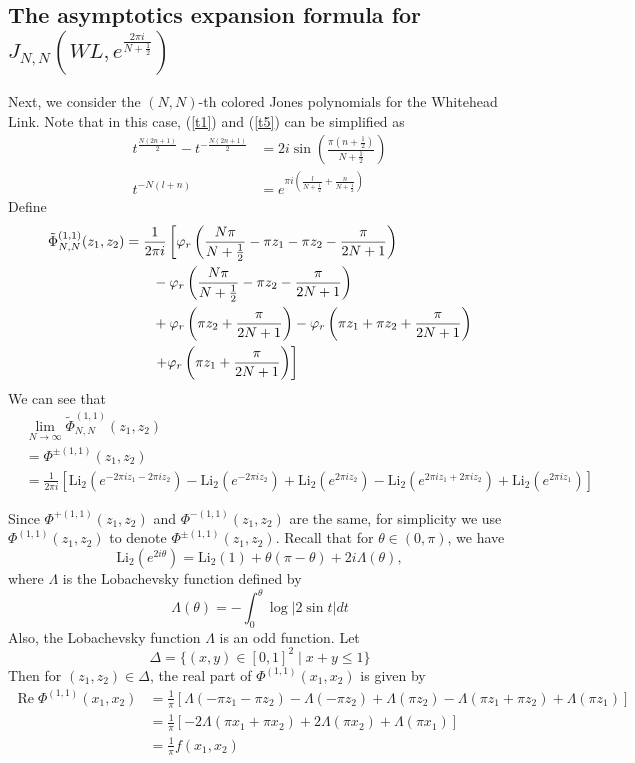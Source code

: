 \documentclass[10pt,a4paper]{article}
\newcommand{\lt}{\left}
\newcommand{\rt}{\right}
\def \Re{\operatorname{Re}}
\def \Re{\operatorname{Re}}
\def \Li{\operatorname{Li_2}}
\begin{document}
\subsection{The asymptotics expansion formula for $J_{N,N}(WL, e^{\frac{2\pi i}{N+\frac{1}{2}}})$}\label{WLNN}
Next, we consider the $(N,N)$-th colored Jones polynomials for the Whitehead Link. Note that in this case, (\ref{t1}) and (\ref{t5}) can be simplified as
\begin{align*}
 t^{\frac{N(2n+1)}{2}}-t^{-\frac{N(2n+1)}{2}} 
&= 2i\sin\lt( \frac{\pi(n+\frac{1}{2})}{N+\frac{1}{2}} \rt) \\
t^{-N(l+n)} 
&= e^{\pi i\lt( \frac{l}{N+\frac{1}{2}} + \frac{n}{N+\frac{1}{2}} \rt)}
\end{align*}
Define
\begin{align}
\tilde\Phi^{(1,1)}_{N,N} (z_1,z_2) 
&= \frac{1}{2\pi i} \lt[\varphi_r \lt( \frac{N\pi}{N+\frac{1}{2}}  - \pi z_1 - \pi z_2 -\frac{\pi}{2N+1}\rt) \rt. \notag\\
&\qquad  - \varphi_r\lt(  \frac{N\pi}{N+\frac{1}{2}} - \pi z_2- \frac{\pi}{2N+1}\rt) \notag \\
&\qquad  + \varphi_r \lt(\pi z_2 + \frac{\pi}{2N+1}\rt)  - \varphi_r\lt( \pi z_1 + \pi z_2 + \frac{\pi}{2N+1}\rt) \notag\\
&\lt.\qquad  + \varphi_r\lt( \pi z_1 + \frac{\pi}{2N+1}\rt) \rt] 
\end{align}
We can see that 
\begin{align*}
&\lim_{N\to\infty} \tilde\Phi^{(1,1)}_{N,N} (z_1,z_2) \\
&= \Phi^{\pm(1,1)}(z_1,z_2)\\
&=  \frac{1}{2\pi i} \lt[ \Li\lt(e^{- 2\pi i z_1 - 2\pi i z_2}\rt) - \Li\lt( e^{ - 2\pi i z_2 }\rt) + \Li \lt(e^{2\pi i z_2}\rt) - \Li\lt(e^{2\pi iz_1+ 2\pi i z_2}\rt)
 + \Li\lt(e^{2\pi i z_1}\rt)  \rt]
\end{align*}

Since $\Phi^{+(1,1)}(z_1,z_2)$ and $\Phi^{-(1,1)}(z_1,z_2)$ are the same, for simplicity we use $\Phi^{(1,1)}(z_1,z_2)$ to denote $\Phi^{\pm(1,1)}(z_1,z_2)$. Recall that for $\theta \in (0,\pi)$, we have 
$$ \Li (e^{2i\theta}) = \Li(1) + \theta(\pi - \theta) + 2i \Lambda(\theta)  ,$$
where $\Lambda$ is the Lobachevsky function defined by
$$ \Lambda(\theta) = -\int_0^\theta \log|2\sin t| dt $$
Also, the Lobachevsky function $\Lambda$ is an odd function. Let $$\Delta = \{(x,y) \in [0,1]^2 \mid x+y \leq 1\}$$
Then for $(z_1,z_2) \in \Delta$, the real part of $\Phi^{(1,1)}(x_1,x_2)$ is given by
\begin{align*}
\Re \Phi^{(1,1)} (x_1,x_2) 
&=  \frac{1}{\pi } \lt[ \Lambda\lt(- \pi  z_1 - \pi  z_2\rt) - \Lambda\lt(  - \pi  z_2 \rt) + \Lambda \lt(\pi  z_2\rt) - \Lambda\lt(\pi z_1+ \pi  z_2\rt) + \Lambda\lt(\pi z_1\rt) \rt] \\
&= \frac{1}{\pi} [-2 \Lambda(\pi x_1 + \pi x_2) + 2\Lambda(\pi x_2) + \Lambda(\pi x_1)]\\
&= \frac{1}{\pi} f(x_1,x_2)
\end{align*}
\end{document}
